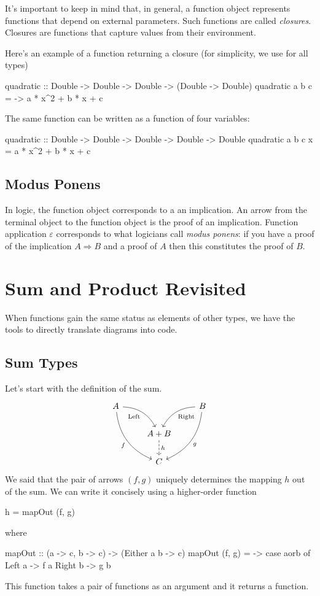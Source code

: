 \documentclass[DaoFP]{subfiles}
\begin{document}
It's important to keep in mind that, in general, a function object represents functions that depend on external parameters. Such functions are called \emph{closures}. Closures are functions that capture values from their environment.

Here's an example of a function returning a closure (for simplicity, we use  for all types)
\begin{haskell}
quadratic :: Double -> Double -> Double -> (Double -> Double)
quadratic a b c = \x -> a * x^2 + b * x + c
\end{haskell}
The same function can be written as a function of four variables:
\begin{haskell}
quadratic :: Double -> Double -> Double -> Double -> Double
quadratic a b c x = a * x^2 + b * x + c
\end{haskell}


\subsection{Modus Ponens}

In logic, the function object corresponds to a an implication. An arrow from the terminal object to the function object is the proof of an implication. Function application $\varepsilon$ corresponds to what logicians call \emph{modus ponens}: if you have a proof of the implication $A \Rightarrow B$ and a proof of $A$ then this constitutes the proof of $B$.

\section{Sum and Product Revisited}

When functions gain the same status as elements of other types, we have the tools to directly translate diagrams into code. 

\subsection{Sum Types}

Let's start with the definition of the sum.
\[
 \begin{tikzcd}
 A
 \arrow[dr,  bend left, "\text{Left}"']
 \arrow[ddr, bend right, "f"']
 && B
 \arrow[dl, bend right, "\text{Right}"]
 \arrow[ddl, bend left, "g"]
 \\
&A + B
\arrow[d, dashed, "h"]
\\
& C
 \end{tikzcd}
\]
We said that the pair of arrows $(f, g)$ uniquely determines the mapping $h$ out of the sum. We can write it concisely using a higher-order function
\begin{haskell}
h = mapOut (f, g)
\end{haskell}
where
\begin{haskell}
mapOut :: (a -> c, b -> c) -> (Either a b -> c)
mapOut (f, g) = \aorb -> case aorb of
                         Left  a -> f a
                         Right b -> g b
\end{haskell}
This function takes a pair of functions as an argument and it returns a function. 
\end{document}

